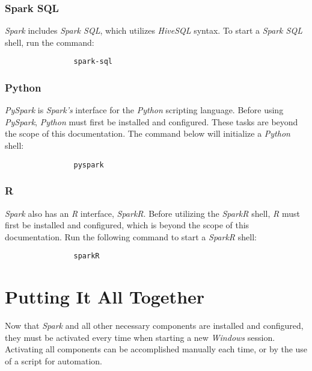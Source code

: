 \documentclass{article}
\begin{document}
            \subsubsection{Spark SQL}
            \emph{Spark} includes \emph{Spark SQL}, which utilizes \emph{HiveSQL} syntax. To start
            a \emph{Spark SQL} shell, run the command:
            \begin{verbatim}
                spark-sql
            \end{verbatim}

            \subsubsection{Python}
            \emph{PySpark} is \emph{Spark's} interface for the \emph{Python} scripting language.
            Before using \emph{PySpark}, \emph{Python} must first be installed and configured.
            These tasks are beyond the scope of this documentation. The command below will initialize
            a \emph{Python} shell:
            \begin{verbatim}
                pyspark
            \end{verbatim}

            \subsubsection{R}
            \emph{Spark} also has an \emph{R} interface, \emph{SparkR}. Before utilizing the \emph{SparkR}
            shell, \emph{R} must first be installed and configured, which is beyond the scope of this
            documentation. Run the following command to start a \emph{SparkR} shell:
            \begin{verbatim}
                sparkR
            \end{verbatim}

\newpage
\section{Putting It All Together}
Now that \emph{Spark} and all other necessary components are installed and configured, they must be
activated every time when starting a new \emph{Windows} session. Activating all components can be
accomplished manually each time, or by the use of a script for automation.
\end{document}
